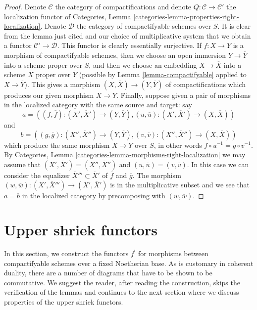 \begin{proof}
Denote $\mathcal{C}$ the category of compactifications and
denote $Q : \mathcal{C} \to \mathcal{C}'$ the localization
functor of Categories, Lemma
\ref{categories-lemma-properties-right-localization}.
Denote $\mathcal{D}$ the category of compactifyable schemes
over $S$. It is clear from the lemma just cited and our
choice of multiplicative system that we
obtain a functor $\mathcal{C}' \to \mathcal{D}$.
This functor is clearly essentially surjective.
If $f : X \to Y$ is a morphism of compactifyable
schemes, then we choose an open immersion $Y \to \overline{Y}$
into a scheme proper over $S$, and then we choose an embedding
$X \to \overline{X}$ into a scheme $\overline{X}$ proper over
$\overline{Y}$ (possible by Lemma \ref{lemma-compactifyable}
applied to $X \to \overline{Y}$). This gives a morphism
$(X, \overline{X}) \to (Y, \overline{Y})$ of compactifications
which produces our given morphism $X \to Y$.
Finally, suppose given a pair of morphisms in the
localized category with the same source and target: say
$$
a = ((f, \overline{f}) : (X', \overline{X}') \to (Y, \overline{Y}),
(u, \overline{u}) : (X', \overline{X}') \to (X, \overline{X}))
$$
and
$$
b = ((g, \overline{g}) : (X'', \overline{X}'') \to (Y, \overline{Y}),
(v, \overline{v}) : (X'', \overline{X}'') \to (X, \overline{X}))
$$
which produce the same morphism $X \to Y$ over $S$, in other words
$f \circ u^{-1} = g \circ v^{-1}$. By
Categories, Lemma \ref{categories-lemma-morphisms-right-localization}
we may assume that $(X', \overline{X}') = (X'', \overline{X}'')$
and $(u, \overline{u}) = (v, \overline{v})$. In this case we
can consider the equalizer $\overline{X}''' \subset \overline{X}'$
of $\overline{f}$ and $\overline{g}$. The morphism
$(w, \overline{w}) : (X', \overline{X}''') \to (X', \overline{X}')$ is in
the multiplicative subset and we see that $a = b$ in the localized
category by precomposing with $(w, \overline{w})$.
\end{proof}







\section{Upper shriek functors}
\label{section-upper-shriek}

\noindent
In this section, we construct the functors $f^!$ for morphisms
between compactifyable schemes over a fixed Noetherian base.
As is customary in coherent duality, there are a number of diagrams
that have to be shown to be commutative. We suggest the reader,
after reading the construction, skips the verification of the
lemmas and continues to the next section where we discuss
properties of the upper shriek functors.

